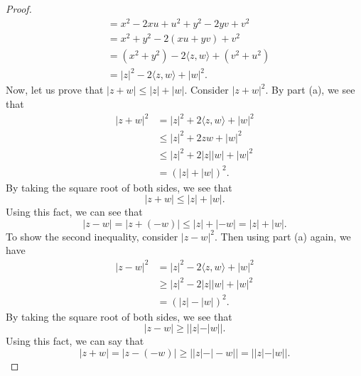\documentclass[a4paper]{article}
\begin{document}
\begin{enumerate}
\begin{proof}
\begin{align*}
                                                           &=  x^{2} -2xu + u^{2} + y^{2} -2yv + v^{2} \\
                                                           &= x^{2} + y^{2} -2(xu + yv) + v^{2} \\
                                                           &= (x^{2}  + y^{2}) -2 \langle z , w \rangle + (v^{2} + u^{2}) \\ 
                                                           &= | z |^{2} - 2 \langle z , w \rangle + | w |^{2}.
\end{align*}
Now, let us prove that \( | z + w  | \leq | z  |  + | w |  \). Consider \( | z + w  |^{2} \). By part (a), we see that
\begin{align*}
    | z + w  |^{2} &= | z  |^{2} + 2 \langle z , w \rangle + | w |^{2} \\
                   &\leq | z |^{2} + 2 z  w + | w |^{2} \\ 
                   &\leq | z |^{2} + 2 | z | | w |  + | w |^{2} \\
                   &= (| z |  + | w | )^{2}.
\end{align*}
By taking the square root of both sides, we see that
\[  | z + w  | \leq | z  |  + | w |. \]
Using this fact, we can see that 
\[  | z - w  |  = | z + (-w) | \leq | z  |  + | -w | = |  z  |  + | w |.  \]
To show the second inequality, consider \( | z - w  |^{2} \). Then using part (a) again, we have
\begin{align*}
    | z - w  |^{2} &= | z |^{2} - 2 \langle z , w \rangle + | w  |^{2} \\
                   & \geq | z |^{2} - 2 | z | | w |  + | w |^{2} \\ 
                   &= (| z |  - | w |)^{2}. 
\end{align*}
By taking the square root of both sides, we see that 
\[  | z - w  | \geq |  | z  |  - | w |  |.  \]
Using this fact, we can say that 
\[  | z + w  |  = | z - (-w) | \geq | | z  |  - | -w |  | = | | z  |  - | w |  |. \]
                \end{proof}
        \end{enumerate}
\end{document}
